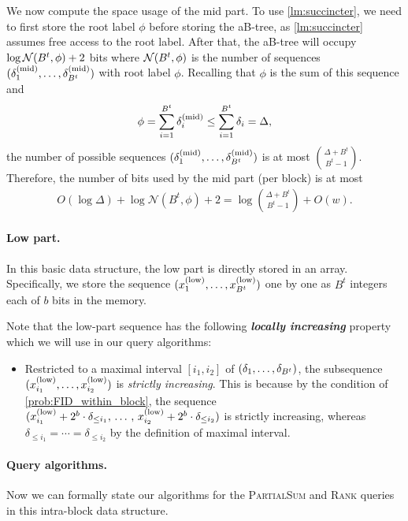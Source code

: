 \documentclass{article}
\theoremstyle{plain}
\theoremstyle{definition}  \newtheorem{definition}[theorem]{Definition}
\DeclarePairedDelimiter{\bk}{(}{)}
\newcommand{\xlow}[1][i]{x_{#1}^{(\textup{low})}}
\newcommand{\deltamid}[1][i]{\delta_{#1}^{(\textup{mid})}}
\newcommand{\rank}{\textup{\textsc{Rank}}\xspace}
\newcommand{\partialsum}{\textup{\textsc{PartialSum}}\xspace}
\newcommand{\defn}[1]{\emph{\textbf{#1}}}
\begin{document}
We now compute the space usage of the mid part. To use \cref{lm:succincter}, we need to first store the root label $\phi$ before storing the aB-tree, as \cref{lm:succincter} assumes free access to the root label.
After that, the aB-tree will occupy $\log \mathcal{N}\bk{B^t, \phi} + 2 $ bits where $\mathcal{N}\bk{B^t, \phi}$ is the number of sequences $\bk{\deltamid[1], \ldots, \deltamid[B^t]}$ with root label $\phi$. Recalling that $\phi$ is the sum of this sequence and
\[\phi = \sum_{i=1}^{B^t}\deltamid \le \sum_{i=1}^{B^t}\delta_i = \Delta,\]
the number of possible sequences $\bk{\deltamid[1], \ldots, \deltamid[B^t]}$ is at most $\binom{\Delta + B^t }{B^t - 1}$. Therefore, the number of bits used by the mid part (per block) is at most
\begin{align*}
  O(\log \Delta) + \log \mathcal{N}(B^t, \phi) + 2 = \log \binom{\Delta + B^t}{B^t - 1} + O(w).
\end{align*}

\paragraph*{Low part.}

In this basic data structure, the low part is directly stored in an array. Specifically, we store the sequence $\bk{\xlow[1], \ldots, \xlow[B^t]}$ one by one as $B^t$ integers each of $b$ bits in the memory.

Note that the low-part sequence has the following \defn{locally increasing} property which we will use in our query algorithms:
\begin{itemize}
  \item Restricted to a maximal interval $[i_1, i_2]$ of $\bk{\delta_1, \ldots, \delta_{B^t}}$, the subsequence $\bk{\xlow[i_1], \ldots, \xlow[i_2]}$ is \emph{strictly increasing}. This is because by the condition of \cref{prob:FID_within_block}, the sequence $\bk{\xlow[i_1] + 2^b \cdot \delta_{\le i_1}, \, \ldots \, , \, \xlow[i_2] + 2^b \cdot \delta_{\le i_2}}$ is strictly increasing, whereas $\delta_{\le i_1} = \cdots =\delta_{\le i_2}$ by the definition of  maximal interval.
  \end{itemize}

\paragraph*{Query algorithms.}
Now we can formally state our algorithms for the \partialsum and \rank queries in this intra-block data structure.
\end{document}
